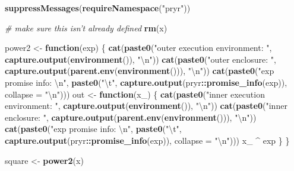 \documentclass[]{book}
\newenvironment{Shaded}{\begin{snugshade}}{\end{snugshade}}
\newcommand{\CharTok}[1]{\textcolor[rgb]{0.31,0.60,0.02}{#1}}
\newcommand{\CommentTok}[1]{\textcolor[rgb]{0.56,0.35,0.01}{\textit{#1}}}
\newcommand{\ControlFlowTok}[1]{\textcolor[rgb]{0.13,0.29,0.53}{\textbf{#1}}}
\newcommand{\DataTypeTok}[1]{\textcolor[rgb]{0.13,0.29,0.53}{#1}}
\newcommand{\KeywordTok}[1]{\textcolor[rgb]{0.13,0.29,0.53}{\textbf{#1}}}
\newcommand{\NormalTok}[1]{#1}
\newcommand{\OperatorTok}[1]{\textcolor[rgb]{0.81,0.36,0.00}{\textbf{#1}}}
\newcommand{\StringTok}[1]{\textcolor[rgb]{0.31,0.60,0.02}{#1}}
\begin{document}
\begin{Shaded}
\begin{Highlighting}[]
\KeywordTok{suppressMessages}\NormalTok{(}\KeywordTok{requireNamespace}\NormalTok{(}\StringTok{"pryr"}\NormalTok{))}

\CommentTok{# make sure this isn't already defined}
\KeywordTok{rm}\NormalTok{(x)}

\NormalTok{power2 <-}\StringTok{ }\ControlFlowTok{function}\NormalTok{(exp) \{}
  \KeywordTok{cat}\NormalTok{(}\KeywordTok{paste0}\NormalTok{(}\StringTok{"outer execution environment: "}\NormalTok{, }\KeywordTok{capture.output}\NormalTok{(}\KeywordTok{environment}\NormalTok{()), }\StringTok{"}\CharTok{\textbackslash{}n}\StringTok{"}\NormalTok{))}
  \KeywordTok{cat}\NormalTok{(}\KeywordTok{paste0}\NormalTok{(}\StringTok{"outer enclosure: "}\NormalTok{, }\KeywordTok{capture.output}\NormalTok{(}\KeywordTok{parent.env}\NormalTok{(}\KeywordTok{environment}\NormalTok{())), }\StringTok{"}\CharTok{\textbackslash{}n}\StringTok{"}\NormalTok{))}
  \KeywordTok{cat}\NormalTok{(}\KeywordTok{paste0}\NormalTok{(}\StringTok{"exp promise info: }\CharTok{\textbackslash{}n}\StringTok{"}\NormalTok{, }\KeywordTok{paste0}\NormalTok{(}\StringTok{"}\CharTok{\textbackslash{}t}\StringTok{"}\NormalTok{, }\KeywordTok{capture.output}\NormalTok{(pryr}\OperatorTok{::}\KeywordTok{promise_info}\NormalTok{(exp)), }\DataTypeTok{collapse =} \StringTok{"}\CharTok{\textbackslash{}n}\StringTok{"}\NormalTok{)))}
\NormalTok{  out <-}\StringTok{ }\ControlFlowTok{function}\NormalTok{(x_) \{}
    \KeywordTok{cat}\NormalTok{(}\KeywordTok{paste0}\NormalTok{(}\StringTok{"inner execution environment: "}\NormalTok{, }\KeywordTok{capture.output}\NormalTok{(}\KeywordTok{environment}\NormalTok{()), }\StringTok{"}\CharTok{\textbackslash{}n}\StringTok{"}\NormalTok{))}
    \KeywordTok{cat}\NormalTok{(}\KeywordTok{paste0}\NormalTok{(}\StringTok{"inner enclosure: "}\NormalTok{, }\KeywordTok{capture.output}\NormalTok{(}\KeywordTok{parent.env}\NormalTok{(}\KeywordTok{environment}\NormalTok{())), }\StringTok{"}\CharTok{\textbackslash{}n}\StringTok{"}\NormalTok{))}
    \KeywordTok{cat}\NormalTok{(}\KeywordTok{paste0}\NormalTok{(}\StringTok{"exp promise info: }\CharTok{\textbackslash{}n}\StringTok{"}\NormalTok{, }\KeywordTok{paste0}\NormalTok{(}\StringTok{"}\CharTok{\textbackslash{}t}\StringTok{"}\NormalTok{, }\KeywordTok{capture.output}\NormalTok{(pryr}\OperatorTok{::}\KeywordTok{promise_info}\NormalTok{(exp)), }\DataTypeTok{collapse =} \StringTok{"}\CharTok{\textbackslash{}n}\StringTok{"}\NormalTok{)))}
\NormalTok{    x_ }\OperatorTok{^}\StringTok{ }\NormalTok{exp}
\NormalTok{  \}}
\NormalTok{\}}

\NormalTok{square <-}\StringTok{ }\KeywordTok{power2}\NormalTok{(x)}
\end{Highlighting}
\end{Shaded}
\end{document}
